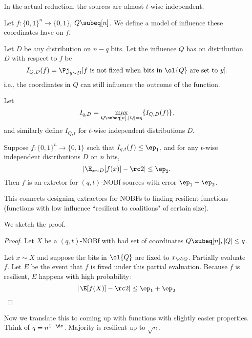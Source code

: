 
In the actual reduction, the sources are almost $t$-wise independent. %

\begin{df}
Let
$f:\{0,1\}^n\to \{0,1\}$, $Q\subeq [n]$. We define a model of influence these coordinates have on $f$.

Let $D$ be any distribution on $n-q$ bits. Let the influence $Q$ has on distribution $D$ with respect to $f$ be
\[
I_{Q,D}(f)=\Pj_{y\sim D}[f\text{ is not fixed when bits in $\ol{Q}$ are set to $y$}].
\]
i.e., the coordinates in $Q$ can still influence the outcome of the function.

Let
\[
I_{q,D}=\max_{Q\subeq [n],|Q|=q} \{I_{Q,D}(f)\},
\]
and similarly define $I_{Q,t}$ for $t$-wise independent distributions $D$.
\end{df}

\begin{lem}
Suppose $f:\{0,1\}^n\to \{0,1\}$ such that $I_{q,t}(f)\le \ep_1$, and for any $t$-wise independent distributions $D$ on $n$ bits, 
\[|\E_{x\sim D}[f(x)]-\rc 2|\le \ep_2.\]
Then $f$ is an extrctor for $(q,t)$-NOBf sources with error $\ep_1+\ep_2$.
\end{lem}
This connects designing extractors for NOBFs to finding resilient functions (functions with low influence ``resilient to coalitions" of  certain size).

We sketch the proof.
\begin{proof}
Let $X$ be a $(q,t)$-NOBf with bad set of coordinates $Q\subeq [n],|Q|\le q$.

Let $x\sim X$ and suppose the bits in $\ol{Q}$ are fixed to $x_{\ol Q}$. Partially evaluate $f$. 
Let $E$ be the event that $f$ is fixed under this partial evaluation. Because $f$ is resilient, $E$ happens with high probability:
\[
|\E[f(X)]-\rc 2|\le \ep_1+\ep_2
\]
\end{proof}
Now we translate this to coming up with functions with slightly easier properties.
Think of $q=n^{1-\de}$. Majority is resilient up to $\sqrt n$.

